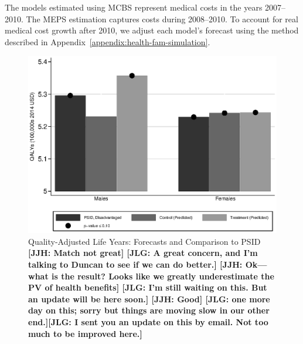 The models estimated using MCBS represent medical costs in the years 2007--2010. The MEPS estimation captures costs during 2008--2010. To account for real medical cost growth after 2010, we adjust each model's forecast using the method described in  Appendix~\ref{appendix:health-fam-simulation}.

\begin{figure}[!htbp]
\caption{Quality-Adjusted Life Years: Forecasts and Comparison to PSID \textbf{[JJH: Match not great] [JLG: A great concern, and I'm talking to Duncan to see if we can do better.] [JJH: Ok---what is the result? Looks like we greatly underestimate the PV of health benefits] [JLG: I'm still waiting on this. But an update will be here soon.] [JJH: Good] [JLG: one more day on this; sorry but things are moving slow in our other end.][JLG: I sent you an update on this by email. Not too much to be improved here.]}}\label{fig:qalys}
\centering
\includegraphics[width=.7\columnwidth]{output/qalyexppsid.eps}
\end{figure}

